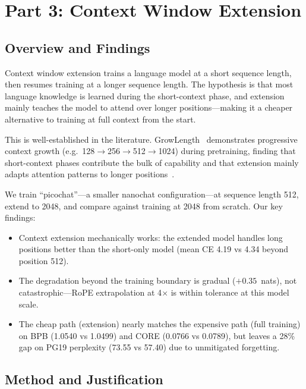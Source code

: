 \documentclass[11pt]{article}
\begin{document}
\section{Part 3: Context Window Extension}

\subsection{Overview and Findings}

Context window extension trains a language model at a short sequence length, then resumes training at a longer sequence length. The hypothesis is that most language knowledge is learned during the short-context phase, and extension mainly teaches the model to attend over longer positions---making it a cheaper alternative to training at full context from the start.

This is well-established in the literature. GrowLength~\cite{growlength} demonstrates progressive context growth (e.g.\ 128$\to$256$\to$512$\to$1024) during pretraining, finding that short-context phases contribute the bulk of capability and that extension mainly adapts attention patterns to longer positions~\cite{skyladder,prolong}.

We train ``picochat''---a smaller nanochat configuration---at sequence length 512, extend to 2048, and compare against training at 2048 from scratch. Our key findings:

\begin{itemize}
  \item Context extension mechanically works: the extended model handles long positions better than the short-only model (mean CE 4.19 vs 4.34 beyond position 512).
  \item The degradation beyond the training boundary is gradual ($+0.35$~nats), not catastrophic---RoPE extrapolation at 4$\times$ is within tolerance at this model scale.
  \item The cheap path (extension) nearly matches the expensive path (full training) on BPB (1.0540 vs 1.0499) and CORE (0.0766 vs 0.0789), but leaves a 28\% gap on PG19 perplexity (73.55 vs 57.40) due to unmitigated forgetting.
\end{itemize}

\subsection{Method and Justification}
\end{document}
